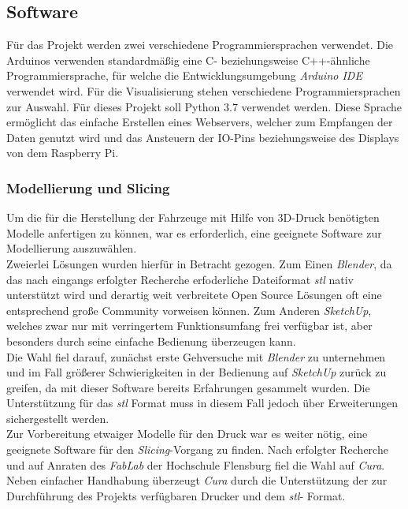 \documentclass[.../Dokumentation.tex]{subfiles}
\begin{document}
    \subsection{Software}\label{sec-components-software}
    Für das Projekt werden zwei verschiedene Programmiersprachen verwendet. 
    Die Arduinos verwenden standardmäßig eine C- beziehungsweise C++-ähnliche 
    Programmiersprache, für welche die Entwicklungsumgebung 
    \textit{Arduino IDE} verwendet wird. 
    Für die Visualisierung stehen verschiedene Programmiersprachen zur Auswahl. 
    Für dieses Projekt soll Python 3.7 verwendet werden. Diese Sprache 
    ermöglicht das einfache Erstellen eines Webservers, welcher zum Empfangen 
    der Daten genutzt wird und das Ansteuern der IO-Pins beziehungsweise des 
    Displays von dem Raspberry Pi.
    
    \subsubsection{Modellierung und Slicing}\label{sec-components-software-model}
    Um die für die Herstellung der Fahrzeuge mit Hilfe von 3D-Druck benötigten 
    Modelle anfertigen zu können, war es erforderlich, eine geeignete Software 
    zur Modellierung auszuwählen.\\
    Zweierlei Lösungen wurden hierfür in Betracht gezogen.
    Zum Einen \textit{Blender}, %
    da das nach eingangs erfolgter Recherche erfoderliche Dateiformat 
    \textit{stl} nativ unterstützt wird und derartig weit verbreitete Open 
    Source Lösungen oft eine entsprechend große Community vorweisen können.
    Zum Anderen \textit{SketchUp}, %
    welches zwar nur mit verringertem 
    Funktionsumfang frei verfügbar ist, aber besonders durch seine einfache 
    Bedienung überzeugen kann.\\
    Die Wahl fiel darauf, zunächst erste Gehversuche mit \textit{Blender} 
    zu unternehmen und im Fall größerer Schwierigkeiten in der Bedienung auf 
    \textit{SketchUp} zurück zu greifen, da mit dieser Software bereits 
    Erfahrungen gesammelt wurden. Die Unterstützung für das \textit{stl} Format 
    muss in diesem Fall jedoch über Erweiterungen sichergestellt werden.\\
    Zur Vorbereitung etwaiger Modelle für den Druck war es weiter nötig, 
    eine geeignete Software für den \textit{Slicing}-Vorgang zu finden.
    Nach erfolgter Recherche und auf Anraten des \textit{FabLab} der Hochschule 
    Flensburg fiel die Wahl auf \textit{Cura}. %
    Neben einfacher Handhabung überzeugt \textit{Cura} durch die Unterstützung 
    der zur Durchführung des Projekts verfügbaren Drucker und dem \textit{stl}-
    Format.
\end{document}
